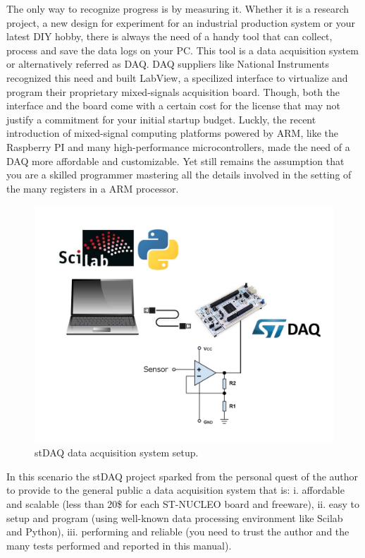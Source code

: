 \documentclass[letterpaper,10pt,english]{hitec}
\begin{document}
The only way to recognize progress is by measuring it. Whether it is a research project, a new design for experiment for an industrial production system or your latest DIY hobby, there is always the need of a handy tool that can collect, process and save the data logs on your PC. This tool is a data acquisition system or alternatively referred as DAQ. DAQ suppliers like National Instruments recognized this need and built LabView, a specilized interface to virtualize and program their proprietary mixed-signals acquisition board. Though, both the interface and the board come with a certain cost for the license that may not justify a commitment for your initial startup budget. Luckly, the recent introduction of mixed-signal computing platforms powered by ARM, like the Raspberry PI and many high-performance microcontrollers, made the need of a DAQ more affordable and customizable. Yet still remains the assumption that you are a skilled programmer mastering all the details involved in the setting of the many registers in a ARM processor.

\begin{figure}[ht!]
\includegraphics[scale=0.47]{../img/stDAQ_system.png}
\caption{stDAQ data acquisition system setup.}
\label{fig:stDAQ_system}
\end{figure}

In this scenario the stDAQ project sparked from the personal quest of the author to provide to the general public a data acquisition system that is: i. affordable and scalable (less than 20\$ for each ST-NUCLEO board and freeware), ii. easy to setup and program (using well-known data processing environment like Scilab and Python), iii. performing and reliable (you need to trust the author and the many tests performed and reported in this manual). 
\end{document}
